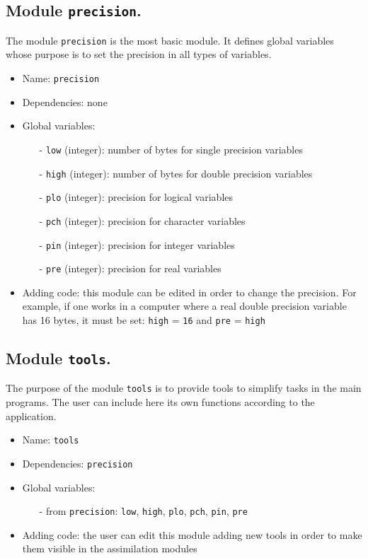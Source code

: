 \documentclass[12pt]{article}
\begin{document}
\subsection{Module {\tt precision}.}
The module {\tt precision} is the most basic module. It defines global variables whose purpose is to set the precision in all types of variables.
\begin{itemize}
\item Name: {\tt precision}
\item Dependencies: none
\item Global variables: 
\begin{itemize}
\item[-] {\tt low} (integer): number of bytes for single precision variables  
\item[-] {\tt high} (integer): number of bytes for double precision variables 
\item[-] {\tt plo} (integer): precision for logical variables                 
\item[-] {\tt pch} (integer): precision for character variables               
\item[-] {\tt pin} (integer): precision for integer variables                 
\item[-] {\tt pre} (integer): precision for real variables                    
\end{itemize}
\item Adding code: this module can be edited in order to change the precision. For example, if one works in a computer where a real double precision variable has 16 bytes, it must be set: {\tt high} = {\tt 16} and {\tt pre} = {\tt high}
\end{itemize}

\subsection{Module {\tt tools}.}
The purpose of the module {\tt tools} is to provide tools to simplify tasks in the main programs. The user can include here its own functions according to the application. 
\begin{itemize}
\item Name: {\tt tools}
\item Dependencies: {\tt precision}
\item Global variables: 
\begin{itemize}
\item[-] from {\tt precision}: {\tt low}, {\tt high}, {\tt plo}, {\tt pch}, {\tt pin}, {\tt pre} 
\end{itemize}
\item Adding code: the user can edit this module adding new tools in order to make them visible in the assimilation modules
\end{itemize}
\end{document}
